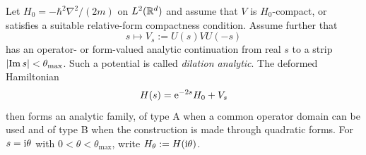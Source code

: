 Let $H_0=-\hbar^2\nabla^2/(2m)$ on $L^2(\mathbb{R}^d)$ and assume that $V$ is
$H_0$-compact, or satisfies a suitable relative-form compactness condition.
Assume further that
\begin{equation}
  s\longmapsto V_s:=U(s)VU(-s)
  \label{eq:dilation-analytic-V}
\end{equation}
has an operator- or form-valued analytic continuation from real $s$ to a
strip $\lvert\operatorname{Im} s\rvert<\theta_{\max}$.  Such a potential is called
\textit{dilation analytic}.  The deformed Hamiltonian
\begin{equation}
  H(s)=\mathrm{e}^{-2s}H_0+V_s
  \label{eq:analytic-Hs}
\end{equation}
then forms an analytic family, of type A when a common operator domain can be
used and of type B when the construction is made through quadratic forms.
For $s=\mathrm{i}\theta$ with $0<\theta<\theta_{\max}$, write
$H_\theta:=H(\mathrm{i}\theta)$.

